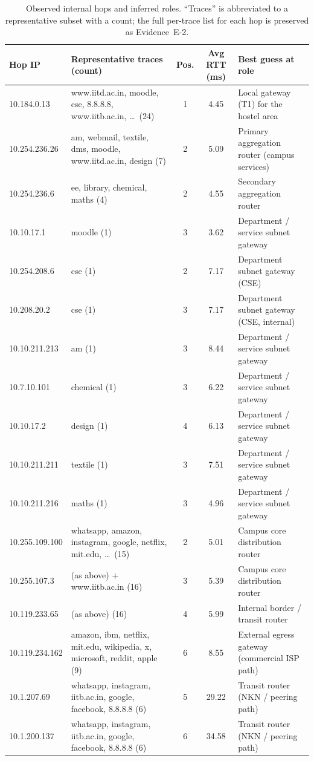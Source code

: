 \begin{table}[H]
\centering
\footnotesize
\caption{Observed internal hops and inferred roles. ``Traces'' is abbreviated to a representative
subset with a count; the full per-trace list for each hop is preserved as Evidence~E-2.}
\label{tab:hophunt}
\begin{tabular}{@{}p{2.1cm}p{4.1cm}ccp{3.9cm}@{}}
\toprule
Hop IP & Representative traces (count) & Pos. & Avg RTT (ms) & Best guess at role \\
\midrule
10.184.0.13 & www.iitd.ac.in, moodle, cse, 8.8.8.8, www.iitb.ac.in, \ldots\ (24) & 1 & 4.45 & Local gateway (T1) for the hostel area \\
10.254.236.26 & am, webmail, textile, dms, moodle, www.iitd.ac.in, design (7) & 2 & 5.09 & Primary aggregation router (campus services) \\
10.254.236.6 & ee, library, chemical, maths (4) & 2 & 4.55 & Secondary aggregation router \\
10.10.17.1 & moodle (1) & 3 & 3.62 & Department / service subnet gateway \\
10.254.208.6 & cse (1) & 2 & 7.17 & Department subnet gateway (CSE) \\
10.208.20.2 & cse (1) & 3 & 7.17 & Department subnet gateway (CSE, internal) \\
10.10.211.213 & am (1) & 3 & 8.44 & Department / service subnet gateway \\
10.7.10.101 & chemical (1) & 3 & 6.22 & Department / service subnet gateway \\
10.10.17.2 & design (1) & 4 & 6.13 & Department / service subnet gateway \\
10.10.211.211 & textile (1) & 3 & 7.51 & Department / service subnet gateway \\
10.10.211.216 & maths (1) & 3 & 4.96 & Department / service subnet gateway \\
10.255.109.100 & whatsapp, amazon, instagram, google, netflix, mit.edu, \ldots\ (15) & 2 & 5.01 & Campus core distribution router \\
10.255.107.3 & (as above) + www.iitb.ac.in (16) & 3 & 5.39 & Campus core distribution router \\
10.119.233.65 & (as above) (16) & 4 & 5.99 & Internal border / transit router \\
10.119.234.162 & amazon, ibm, netflix, mit.edu, wikipedia, x, microsoft, reddit, apple (9) & 6 & 8.55 & External egress gateway (commercial ISP path) \\
10.1.207.69 & whatsapp, instagram, iitb.ac.in, google, facebook, 8.8.8.8 (6) & 5 & 29.22 & Transit router (NKN / peering path) \\
10.1.200.137 & whatsapp, instagram, iitb.ac.in, google, facebook, 8.8.8.8 (6) & 6 & 34.58 & Transit router (NKN / peering path) \\
\bottomrule
\end{tabular}
\end{table}

